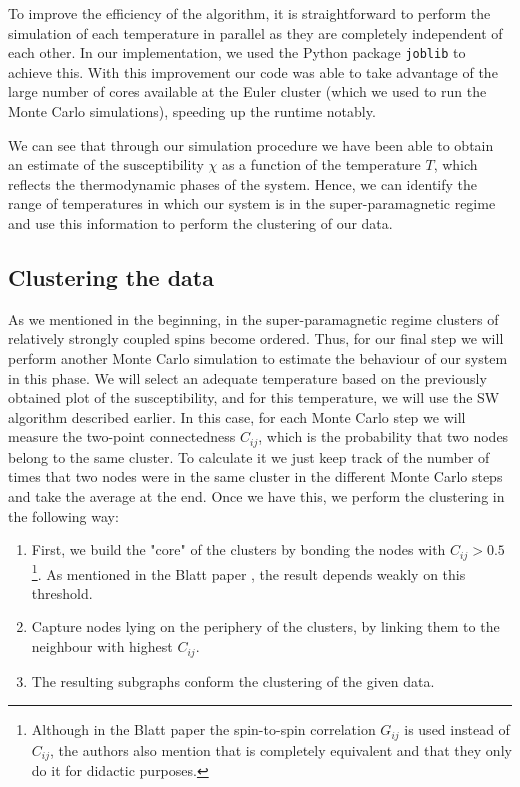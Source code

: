 \documentclass{article} %
\begin{document}
To improve the efficiency of the algorithm, it is straightforward to perform the simulation of each temperature in parallel as they are completely independent of each other. In our implementation, we used the Python package \texttt{joblib} to achieve this. With this improvement our code was able to take advantage of the large number of cores available at the Euler cluster (which we used to run the Monte Carlo simulations), speeding up the runtime notably.

We can see that through our simulation procedure we have been able to obtain an estimate of the susceptibility $\chi$ as a function of the temperature $T$, which reflects the thermodynamic phases of the system. Hence, we can identify the range of temperatures in which our system is in the super-paramagnetic regime and use this information to perform the clustering of our data.

\subsection{Clustering the data}
As we mentioned in the beginning, in the super-paramagnetic regime clusters of relatively strongly coupled spins become ordered. Thus, for our final step we will perform another Monte Carlo simulation to estimate the behaviour of our system in this phase. We will select an adequate temperature based on the previously obtained plot of the susceptibility, and for this temperature, we will use the SW algorithm described earlier. In this case, for each Monte Carlo step we will measure the two-point connectedness $C_{ij}$, which is the probability that two nodes belong to the same cluster. To calculate it we just keep track of the number of times that two nodes were in the same cluster in the different Monte Carlo steps and take the average at the end. Once we have this, we perform the clustering in the following way:
\begin{enumerate}
\item First, we build the "core" of the clusters by bonding the nodes with $C_{ij}>0.5$\footnote{Although in the Blatt paper \cite{Blatt1997} the spin-to-spin correlation $G_{ij}$ is used instead of $C_{ij}$, the authors also mention that is completely equivalent and that they only do it for didactic purposes.}. As mentioned in the Blatt paper \cite{Blatt1997}, the result depends weakly on this threshold.
\item Capture nodes lying on the periphery of the clusters, by linking them to the neighbour with highest $C_{ij}$.
\item The resulting subgraphs conform the clustering of the given data.
\end{enumerate}
\end{document}
